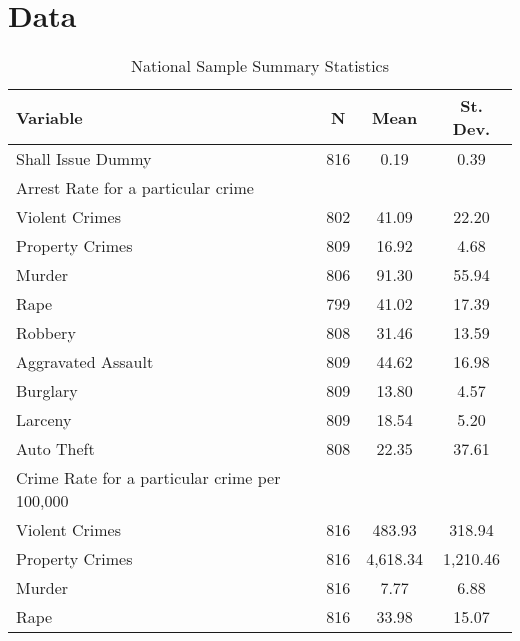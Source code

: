\documentclass{article}
\begin{document}
\section*{Data}

\begin{table}[h] \centering 
  \caption{National Sample Summary Statistics} 
  \label{tab:summary} 
\begin{tabular}[t]{@{\extracolsep{5pt}}lccc}
\toprule 
Variable & \multicolumn{1}{c}{N} & \multicolumn{1}{c}{Mean} & \multicolumn{1}{c}{St. Dev.} \\ 
\midrule
Shall Issue Dummy & 816 & 0.19 & 0.39 \\ 
Arrest Rate for a particular crime &&&\\
\hspace{3mm}Violent Crimes & 802 & 41.09 & 22.20 \\ 
\hspace{3mm}Property Crimes & 809 & 16.92 & 4.68 \\ 
\hspace{3mm}Murder & 806 & 91.30 & 55.94 \\ 
\hspace{3mm}Rape & 799 & 41.02 & 17.39 \\ 
\hspace{3mm}Robbery & 808 & 31.46 & 13.59 \\ 
\hspace{3mm}Aggravated Assault & 809 & 44.62 & 16.98 \\ 
\hspace{3mm}Burglary & 809 & 13.80 & 4.57 \\ 
\hspace{3mm}Larceny & 809 & 18.54 & 5.20 \\ 
\hspace{3mm}Auto Theft & 808 & 22.35 & 37.61 \\ 
Crime Rate for a particular crime per 100,000 &&&\\
\hspace{3mm}Violent Crimes & 816 & 483.93 & 318.94 \\ 
\hspace{3mm}Property Crimes & 816 & 4,618.34 & 1,210.46 \\ 
\hspace{3mm}Murder & 816 & 7.77 & 6.88 \\ 
\hspace{3mm}Rape & 816 & 33.98 & 15.07 \\ 

\end{tabular}
\end{table}
\end{document}
